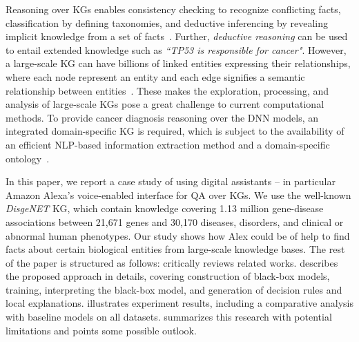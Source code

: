 \documentclass[10pt,journal,compsoc]{IEEEtran}
\begin{document}
Reasoning over KGs enables consistency checking to recognize conflicting facts, classification by defining taxonomies, and deductive inferencing by revealing implicit knowledge from a set of facts~\cite{futia2020integration}. Further, \textit{deductive reasoning} can be used to entail extended knowledge such as \textit{``TP53 is responsible for cancer"}\cite{karim_phd_thesis_2022}. However, a large-scale KG can have billions of linked entities expressing their relationships, where each node represent an entity and each edge signifies a semantic relationship between entities~\cite{karim2019drug}. These makes the exploration, processing, and analysis of large-scale KGs pose a great challenge to current computational methods. To provide cancer diagnosis reasoning over the DNN models, an integrated domain-specific KG is required, which is subject to the availability of an efficient NLP-based information extraction method and a domain-specific ontology~\cite{karim_phd_thesis_2022}. %

In this paper, we report a case study of using digital assistants -- in particular Amazon Alexa's voice-enabled interface for QA over KGs. We use the well-known \emph{DisgeNET} KG, which contain knowledge covering 1.13 million gene-disease associations between 21,671 genes and 30,170 diseases, disorders, and clinical or abnormal human phenotypes. Our study shows how Alex could be of help to find facts about certain biological entities from large-scale knowledge bases. 
The rest of the paper is structured as follows:  critically reviews related works.  describes the proposed approach in details, covering construction of black-box models, training, interpreting the black-box model, and generation of decision rules and local explanations.  illustrates experiment results, including a comparative analysis with baseline models on all datasets.  summarizes this research with potential limitations and points some possible outlook. %
\end{document}
